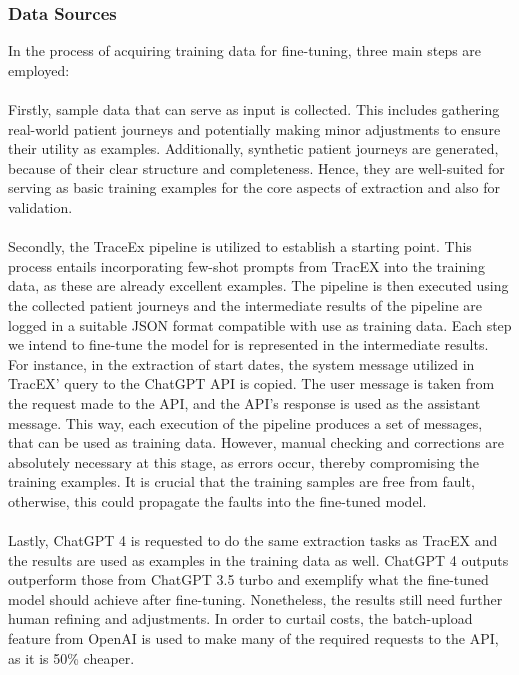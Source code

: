 \subsubsection{Data Sources}\label{sec:data_sources}
In the process of acquiring training data for fine-tuning, three main steps are employed:\\\\
Firstly, sample data that can serve as input is collected. This includes gathering real-world patient journeys and potentially making minor adjustments to ensure their utility as examples. Additionally, synthetic patient journeys are generated, because of their clear structure and completeness. Hence, they are well-suited for serving as basic training examples for the core aspects of extraction and also for validation.\\\\
Secondly, the TraceEx pipeline is utilized to establish a starting point. This process entails incorporating few-shot prompts from TracEX into the training data, as these are already excellent examples. The pipeline is then executed using the collected patient journeys and the intermediate results of the pipeline are logged in a suitable JSON format compatible with use as training data. Each step we intend to fine-tune the model for is represented in the intermediate results. For instance, in the extraction of start dates, the system message utilized in TracEX' query to the ChatGPT API is copied. The user message is taken from the request made to the API, and the API's response is used as the assistant message. This way, each execution of the pipeline produces a set of messages, that can be used as training data. However, manual checking and corrections are absolutely necessary at this stage, as errors occur, thereby compromising the training examples. It is crucial that the training samples are free from fault, otherwise, this could propagate the faults into the fine-tuned model.\\\\
Lastly, ChatGPT 4 is requested to do the same extraction tasks as TracEX and the results are used as examples in the training data as well. ChatGPT 4 outputs outperform those from ChatGPT 3.5 turbo and exemplify what the fine-tuned model should achieve after fine-tuning. Nonetheless, the results still need further human refining and adjustments. In order to curtail costs, the batch-upload feature from OpenAI is used to make many of the required requests to the API, as it is 50\% cheaper.

